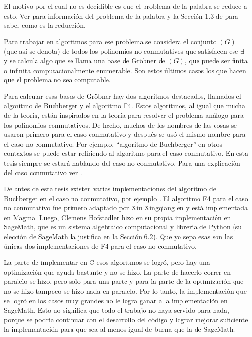 \documentclass[12pt]{report}
\theoremstyle{customstyle}
\theoremstyle{factstyle}
\newcommand\cpp{C\nolinebreak[4]\hspace{-.05em}\raisebox{.4ex}{\relsize{-3}{\textbf{++}}}\xspace}
\begin{document}
El motivo por el cual no es decidible es que el problema de la palabra se reduce a esto. Ver \cite{web:wiki:WordPproblem} para información del problema de la palabra y la Sección 1.3 de \cite{article:MORA1994131} para saber como es la reducción.

Para trabajar en algoritmos para ese problema se considera el conjunto $(G)$ (que así se denota) de todos los polinomios no conmutativos que satisfacen ese $∃$ y se calcula algo que se llama una base de Gröbner de $(G)$, que puede ser finita o infinita computacionalmente enumerable. Son estos últimos casos los que hacen que el problema no sea computable. %

Para calcular esas bases de Gröbner hay dos algoritmos destacados, llamados el algoritmo de Buchberger y el algoritmo F4. Estos algoritmos, al igual que mucha de la teoría, están inspirados en la teoría para resolver el problema análogo para los polinomios conmutativos. De hecho, muchos de los nombres de las cosas se usaron primero para el caso conmutativo y después se usó el mismo nombre para el caso no conmutativo. Por ejemplo, ``algoritmo de Buchberger'' en otros contextos se puede estar refiriendo al algoritmo para el caso conmutativo. En esta tesis siempre se estará hablando del caso no conmutativo. Para una explicación del caso conmutativo ver \cite{book:ideals-varieties-algorithms}.

De antes de esta tesis existen varias implementaciones del algoritmo de Buchberger en el caso no conmutativo, por ejemplo \cite{lib:GBNP, lib:DGPS, lib:NCAlgebra}. El algoritmo F4 para el caso no conmutativo fue primero adaptado por Xiu Xingqiang en \cite{phdthesis:XiuXingqiang12} y está implementada en Magma. Luego, Clemens Hofstadler hizo en \cite{thesis:Hof20} su propia implementación en SageMath, que es un  sistema algebraico computacional y librería de Python (su elección de SageMath la justifica en la Sección 6.2). Que yo sepa esas son las únicas dos implementaciones de F4 para el caso no conmutativo.

La parte de implementar en \cpp esos algoritmos se logró, pero hay una optimización que ayuda bastante y no se hizo. La parte de hacerlo correr en paralelo se hizo, pero solo para una parte y para la parte de la optimización que no se hizo tampoco se hizo nada en paralelo. Por lo tanto, la implementación que se logró en los casos muy grandes no le logra ganar a la implementación en SageMath. Esto no significa que todo el trabajo no haya servido para nada, porque se podría continuar con el desarrollo del código y lograr mejorar suficiente la implementación para que sea al menos igual de buena que la de SageMath.
\end{document}
